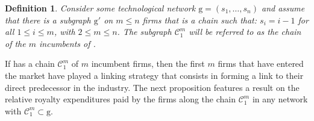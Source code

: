 \documentclass{article}
\newtheorem{definition}{Definition}
\begin{document}
\begin{definition}
Consider some technological network $\text{g}=(s_1,\ldots, s_n)$ and assume that there is a subgraph $\text{g}'$ on $m\leq n$ firms that is a chain such that: $s_i=i-1$ for all $1\leq i \leq m$, with $2\leq m\leq n$. The subgraph $\mathcal{C}_1^m$ will be referred to as the chain of the $m$ incumbents of .
\end{definition}

If  has a chain $\mathcal{C}_1^m$ of $m$ incumbent firms, then the first $m$ firms that have entered the market have played a linking strategy that consists in forming a link to their direct predecessor in the industry. The next proposition features a result on the relative royalty expenditures paid by the firms along the chain $\mathcal{C}_1^m$ in any network  with $\mathcal{C}_1^m\subset \text{g}$.\\
\end{document}
